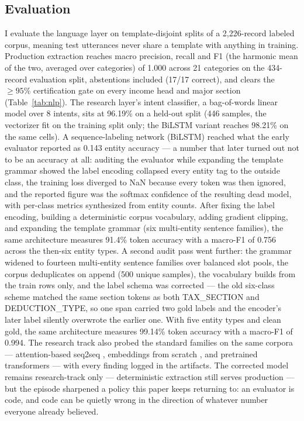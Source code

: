 \documentclass[conference]{IEEEtran}
\begin{document}
\subsection{Evaluation}
I evaluate the language layer on template-disjoint splits of a
2{,}226-record labeled corpus, meaning test utterances never share a
template with anything in training. Production extraction reaches
macro precision, recall and F1 (the harmonic mean of the two,
averaged over categories) of 1.000 across 21 categories on the
434-record evaluation split, abstentions included (17/17 correct),
and clears the $\geq 95\%$ certification gate on every income head and
major section (Table~\ref{tab:nlp}). The research layer's intent
classifier, a bag-of-words linear model over 8 intents, sits at
96.19\% on a held-out split (446 samples, the vectorizer fit on the
training split only; the BiLSTM variant reaches 98.21\% on the same
cells). A sequence-labeling network (BiLSTM) reached what the early
evaluator reported as 0.143 entity accuracy --- a number that later
turned out not to be an accuracy at all: auditing the evaluator while
expanding the template grammar showed the label encoding collapsed every entity tag to the
outside class, the training loss diverged to NaN because every token
was then ignored, and the reported figure was the softmax confidence
of the resulting dead model, with per-class metrics synthesized from
entity counts. After fixing the label encoding, building a
deterministic corpus vocabulary, adding gradient clipping, and
expanding the template grammar (six multi-entity sentence families),
the same architecture measures 91.4\% token accuracy with a macro-F1
of 0.756 across the then-six entity types. A second audit pass went
further: the grammar widened to fourteen multi-entity sentence
families over balanced slot pools, the corpus deduplicates on append
(500 unique samples), the vocabulary builds from the train rows only,
and the label schema was corrected --- the old six-class scheme
matched the same section tokens as both TAX\_SECTION and
DEDUCTION\_TYPE, so one span carried two gold labels and the encoder's
later label silently overwrote the earlier one. With five entity
types and clean gold, the same architecture measures 99.14\% token
accuracy with a macro-F1 of 0.994. The research track also probed the
standard families on the same corpora --- attention-based seq2seq
\cite{bahdanau2015, luong2015, sutskever2014}, embeddings from scratch
\cite{mikolov2013, pennington2014}, and pretrained transformers
\cite{devlin2019, vaswani2017} --- with every finding logged in the
artifacts. The corrected model remains
research-track only --- deterministic extraction still serves
production --- but the episode sharpened a policy this paper keeps
returning to: an evaluator is code, and code can be quietly wrong in
the direction of whatever number everyone already believed.
\end{document}
